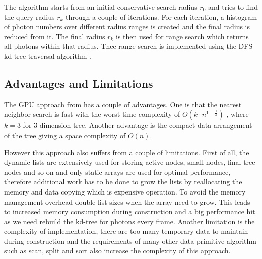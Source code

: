 The algorithm starts from an initial conservative search radius \(r_{0}\) and tries to find the query radius \(r_{k}\) through a couple of iterations. For each iteration, a histogram of photon numbers over different radius ranges is created and the final radius is reduced from it. The final radius \(r_{k}\) is then used for range search which returns all photons within that radius. Thee range search is implemented using the DFS kd-tree traversal algorithm \cite{Preparata:1985:CGI:4333}. 

\subsection{Advantages and Limitations}
The GPU approach from \citeauthor{Zhou2008} has a couple of advantages. One is that the nearest neighbor search is fast with the worst time complexity of \(O(k\cdot n^{1-\frac{1}{k}})\) \cite{Lee1977}, where \(k = 3\) for 3 dimension tree. Another advantage is the compact data arrangement of the tree giving a space complexity of \(O(n)\). 

However this approach also suffers from a couple of limitations. First of all, the dynamic lists are extensively used for storing active nodes, small nodes, final tree nodes and so on and only static arrays are used for optimal performance, therefore additional work has to be done to grow the lists by reallocating the memory and data copying which is expensive operation. To avoid the memory management overhead \citeauthor{Zhou2008} double list sizes when the array need to grow. This leads to increased memory consumption during construction and a big performance hit as we need rebuild the kd-tree for photons every frame. Another limitation is the complexity of implementation, there are too many temporary data to maintain during construction and the requirements of many other data primitive algorithm such as scan, split and sort also increase the complexity of this approach. 
